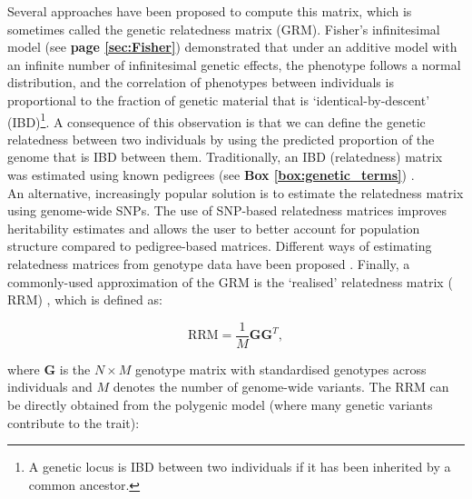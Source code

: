 Several approaches have been proposed to compute this matrix, which is sometimes called the genetic relatedness matrix (GRM).
Fisher’s infinitesimal model (see \textbf{page \ref{sec:Fisher}}) \cite{fisher1919xv} demonstrated that under an additive model with an infinite number of infinitesimal genetic effects, the phenotype follows a normal distribution, and the correlation of phenotypes between individuals is proportional to the fraction of genetic material that is `identical-by-descent' (IBD)\footnote{A genetic locus is IBD between two individuals if it has been inherited by a common ancestor.}. 
A consequence of this observation is that we can define the genetic relatedness between two individuals by using the predicted proportion of the genome that is IBD between them. 
Traditionally, an IBD (relatedness) matrix was estimated using known pedigrees (see \textbf{Box \ref{box:genetic_terms}}) \cite{lange1976extensions}. 
\\

An alternative, increasingly popular solution is to estimate the relatedness matrix using genome-wide SNPs. 
The use of SNP-based relatedness matrices improves
heritability estimates \cite{visscher2006assumption, visscher2007genome, hayes2009increased} and allows the user to better account for population structure \cite{kang2008efficient, lee2010using} compared to pedigree-based matrices. 
Different ways of estimating relatedness matrices from genotype data have been proposed \cite{oliehoek2006estimating, purcell2007plink, vanraden2008efficient}. 
Finally, a commonly-used approximation of the GRM is the `realised' relatedness matrix ($\mathrm{RRM}$) \cite{hayes2009increased}, which is defined as:

 \begin{equation}
    \mathrm{RRM} = \frac{1}{M}\mathbf{G}\mathbf{G}^T,
\end{equation}

where $\mathbf{G}$ is the $N \times M$ genotype matrix with standardised genotypes across individuals and $M$ denotes the number of genome-wide variants. 
The $\mathrm{RRM}$ can be directly obtained from the polygenic model (where many genetic variants contribute to the trait):

